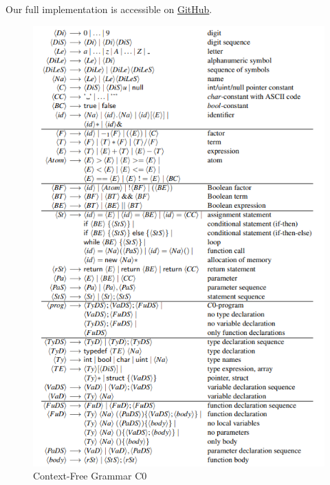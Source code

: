 \documentclass[11pt]{report}
\begin{document}
    Our full implementation is accessible on \href{https://github.com/fyfsb/dcfg.git}{GitHub}.

    \begin{figure}[h!]
        \center
        \includegraphics[width=13cm]{C0.png}
        \caption{Context-Free Grammar C0}
        \label{fig:grammar_c0}
    \end{figure}

    \tableofcontents
    
    
\end{document}
